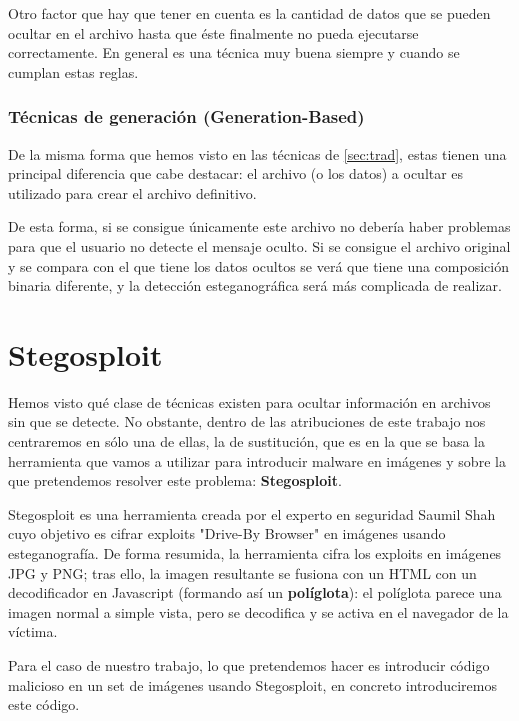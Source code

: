 Otro factor que hay que tener en cuenta es la cantidad de datos que se pueden ocultar en el archivo hasta que éste finalmente no pueda ejecutarse correctamente. En general es una técnica muy buena siempre y cuando se cumplan estas reglas.

\subsubsection{Técnicas de generación (Generation-Based)}

De la misma forma que hemos visto en las técnicas de \ref{sec:trad}, estas tienen una principal diferencia que cabe destacar: el archivo (o los datos) a ocultar es utilizado para crear el archivo definitivo.

De esta forma, si se consigue únicamente este archivo no debería haber problemas para que el usuario no detecte el mensaje oculto. Si se consigue el archivo original y se compara con el que tiene los datos ocultos se verá que tiene una composición binaria diferente, y la detección esteganográfica será más complicada de realizar.

\section{Stegosploit}

Hemos visto qué clase de técnicas existen para ocultar información en archivos sin que se detecte. No obstante, dentro de las atribuciones de este trabajo nos centraremos en sólo una de ellas, la de sustitución, que es en la que se basa la herramienta que vamos a utilizar para introducir malware en imágenes y sobre la que pretendemos resolver este problema: \textbf{Stegosploit}. %

Stegosploit es una herramienta creada por el experto en seguridad Saumil Shah cuyo objetivo es cifrar exploits "Drive-By Browser" en imágenes usando esteganografía. De forma resumida, la herramienta cifra los exploits en imágenes JPG y PNG; tras ello, la imagen resultante se fusiona con un HTML con un decodificador en Javascript (formando así un \textbf{políglota}): el políglota parece una imagen normal a simple vista, pero se decodifica y se activa en el navegador de la víctima. %

Para el caso de nuestro trabajo, lo que pretendemos hacer es introducir código malicioso en un set de imágenes usando Stegosploit, en concreto introduciremos este código.


